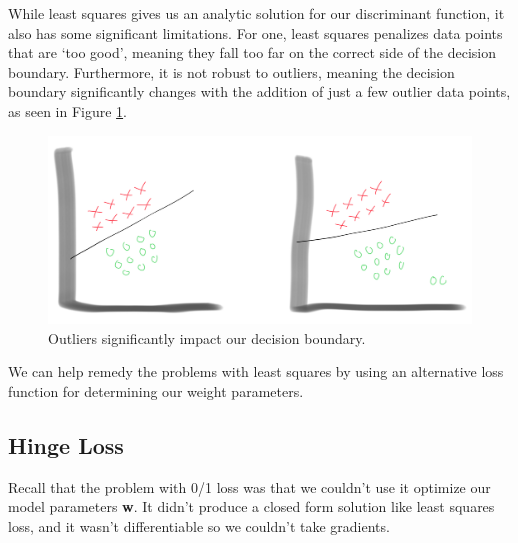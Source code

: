 While least squares gives us an analytic solution for our discriminant function, it also has some significant limitations. For one, least squares penalizes data points that are `too good', meaning they fall too far on the correct side of the decision boundary. Furthermore, it is not robust to outliers, meaning the decision boundary significantly changes with the addition of just a few outlier data points, as seen in Figure \ref{fig:outlier-phenomenon}.

\begin{figure}
    \centering
    \includegraphics[width=0.5\paperwidth]{../Classification/fig/outlier_phenomenon_ipad.jpg}
    \caption{Outliers significantly impact our decision boundary.}
    \label{fig:outlier-phenomenon}
\end{figure}

We can help remedy the problems with least squares by using an alternative loss function for determining our weight parameters.

\subsection{Hinge Loss}
Recall that the problem with 0/1 loss was that we couldn't use it optimize our model parameters \textbf{w}. It didn't produce a closed form solution like least squares loss, and it wasn't differentiable so we couldn't take gradients.

